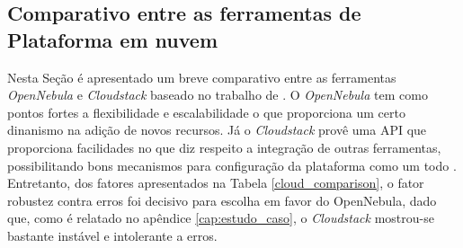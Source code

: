 \subsection{Comparativo entre as ferramentas de Plataforma em nuvem}

Nesta Seção é apresentado um breve comparativo entre as ferramentas \textit{OpenNebula} e \textit{Cloudstack} baseado no trabalho de . O \textit{OpenNebula} tem como pontos fortes a flexibilidade e escalabilidade o que proporciona um certo dinanismo na adição de novos recursos. Já o \textit{Cloudstack} provê uma API que proporciona facilidades no que diz respeito a integração de outras ferramentas, possibilitando bons mecanismos para configuração da plataforma como um todo \cite{salam}. Entretanto, dos fatores apresentados na Tabela \ref{cloud_comparison}, o fator robustez contra erros foi decisivo para escolha em favor do OpenNebula, dado que, como é relatado no apêndice \ref{cap:estudo_caso}, o \textit{Cloudstack} mostrou-se bastante instável e intolerante a erros.


